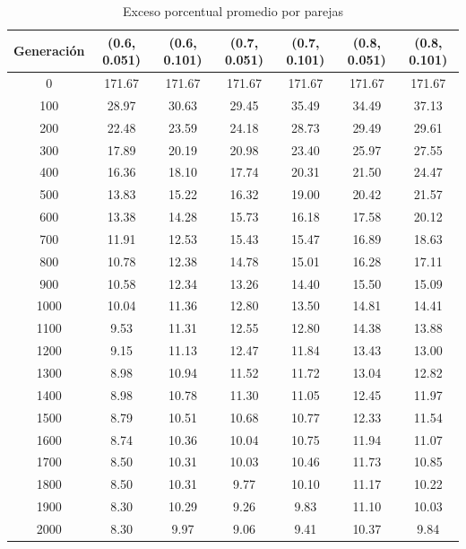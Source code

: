 \documentclass[12pt]{article}
\begin{document}
\begin{center}
  \begin{table}[!htbp]
    \caption{Exceso porcentual promedio por parejas}
    \begin{tabular}{| c | c | c | c | c | c | c |}
    \hline
      Generación & (0.6, 0.051)  & (0.6, 0.101)  & (0.7, 0.051)  & (0.7, 0.101)  & (0.8, 0.051)  & (0.8, 0.101)  \\ \hline
      0 & 171.67 & 171.67 & 171.67 & 171.67 & 171.67 & 171.67 \\ \hline
      100 & 28.97 & 30.63 & 29.45 & 35.49 & 34.49 & 37.13 \\ \hline
      200 & 22.48 & 23.59 & 24.18 & 28.73 & 29.49 & 29.61 \\ \hline
      300 & 17.89 & 20.19 & 20.98 & 23.40 & 25.97 & 27.55 \\ \hline
      400 & 16.36 & 18.10 & 17.74 & 20.31 & 21.50 & 24.47 \\ \hline
      500 & 13.83 & 15.22 & 16.32 & 19.00 & 20.42 & 21.57 \\ \hline
      600 & 13.38 & 14.28 & 15.73 & 16.18 & 17.58 & 20.12 \\ \hline
      700 & 11.91 & 12.53 & 15.43 & 15.47 & 16.89 & 18.63 \\ \hline
      800 & 10.78 & 12.38 & 14.78 & 15.01 & 16.28 & 17.11 \\ \hline
      900 & 10.58 & 12.34 & 13.26 & 14.40 & 15.50 & 15.09 \\ \hline
      1000 & 10.04 & 11.36 & 12.80 & 13.50 & 14.81 & 14.41 \\ \hline
      1100 & 9.53 & 11.31 & 12.55 & 12.80 & 14.38 & 13.88 \\ \hline
      1200 & 9.15 & 11.13 & 12.47 & 11.84 & 13.43 & 13.00 \\ \hline
      1300 & 8.98 & 10.94 & 11.52 & 11.72 & 13.04 & 12.82 \\ \hline
      1400 & 8.98 & 10.78 & 11.30 & 11.05 & 12.45 & 11.97 \\ \hline
      1500 & 8.79 & 10.51 & 10.68 & 10.77 & 12.33 & 11.54 \\ \hline
      1600 & 8.74 & 10.36 & 10.04 & 10.75 & 11.94 & 11.07 \\ \hline
      1700 & 8.50 & 10.31 & 10.03 & 10.46 & 11.73 & 10.85 \\ \hline
      1800 & 8.50 & 10.31 & 9.77 & 10.10 & 11.17 & 10.22 \\ \hline
      1900 & 8.30 & 10.29 & 9.26 & 9.83 & 11.10 & 10.03 \\ \hline
      2000 & 8.30 & 9.97 & 9.06 & 9.41 & 10.37 & 9.84 \\ \hline
    \end{tabular}
  \end{table}
\end{center}
\end{document}
